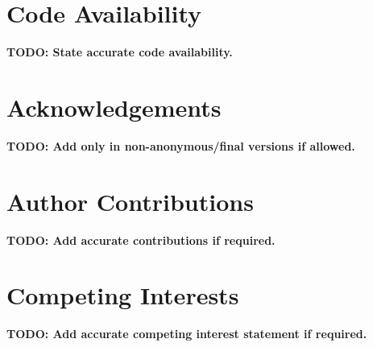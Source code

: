 \documentclass[11pt]{article}
\newcommand{\todo}[1]{\textbf{TODO: #1}}
\begin{document}
\section*{Code Availability}

\todo{State accurate code availability.}

\section*{Acknowledgements}

\todo{Add only in non-anonymous/final versions if allowed.}

\section*{Author Contributions}

\todo{Add accurate contributions if required.}

\section*{Competing Interests}

\todo{Add accurate competing interest statement if required.}


% 
\end{document}
